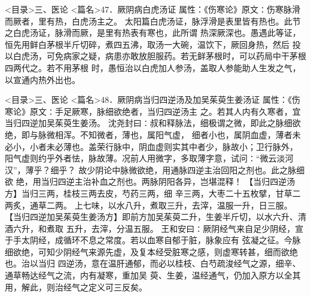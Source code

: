 \documentclass[a4paper,12pt,UTF8,twoside]{ctexbook}
\begin{document}
<目录>三、医论
<篇名>47．厥阴病白虎汤证
属性：《伤寒论》原文∶伤寒脉滑而厥者，里有热，白虎汤主之。 
太阳篇白虎汤证，脉浮滑是表里皆有热也。此节之白虎汤证，脉滑而厥，是里有热表有寒也，此所谓 
热深厥深也。愚遇此等证，恒先用鲜白茅根半斤切碎，煮四五沸，取汤一大碗，温饮下，厥回身热，然后 
投以白虎汤，可免病家之疑，病患亦敢放胆服药。若无鲜茅根时，可以药局中干茅根四两代之。若不用茅根 
时，愚恒治以白虎加人参汤，盖取人参能助人生发之气，以宣通内热外出也。 

<目录>三、医论
<篇名>48．厥阴病当归四逆汤及加吴茱萸生姜汤证
属性：《伤寒论》原文∶手足厥寒，脉细欲绝者，当归四逆汤主 
之。若其人内有久寒者，宜当归四逆加吴茱萸生姜汤。 
沈尧封曰∶叔和释脉法，细极谓之微，即此之脉细欲绝，即与脉微相浑。不知微者，薄也，属阳气虚， 
细者小也，属阴血虚，薄者未必小，小者未必薄也。盖荣行脉中，阴血虚则实其中者少，脉故小；卫行脉外， 
阳气虚则约乎外者怯，脉故薄。况前人用微字，多取薄字意，试问∶“微云淡河汉”，薄乎？细乎？ 
故少阴论中脉微欲绝，用通脉四逆主治回阳之剂也。此之脉细欲 
绝，用当归四逆主治补血之剂也。两脉阴阳各异，岂堪混释！ 
【当归四逆汤方】当归三两，桂枝三两去皮，芍药三两，细 
辛三两，大枣二十五枚擘，甘草二两炙，通草二两。 
上七味，以水八升，煮取三升，去滓，温服一升，日三服。 
【当归四逆加吴茱萸生姜汤方】即前方加吴茱萸二升，生姜半斤切，以水六升、清酒六升，和煮取 
五升，去滓，分温五服。 
王和安曰∶厥阴经气来自足少阴经，宣于手太阴经，成循环不息之常度。若以血寒自郁于脏，脉象应有 
弦凝之征。今脉细欲绝，可知少阴经气来源先虚，及复本经受脏寒之感，则虚寒转甚，细而欲绝也。治以当归 
四逆汤，意在温肝通郁，而必以桂枝、白芍疏浚经气之源，细辛、通草畅达经气之流，内有凝寒，重加吴 
萸、生姜，温经通气，仍加入原方以全其用，解此，则治经气之定义可三反矣。 
\end{document}
